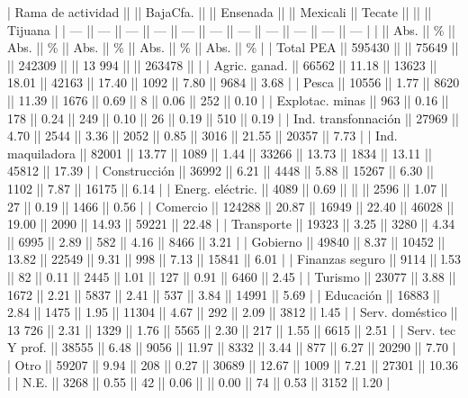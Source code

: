 \documentclass{article}
\begin{document}
| Rama de actividad   ||        || BajaCfa. ||       || Ensenada ||        || Mexicali || Tecate ||       ||        || Tijuana |
| ---                 || ---    || ---      || ---   || ---      || ---    || ---      || ---    || ---   || ---    || ---     |
|                     || Abs.   || \%        || Abs.  || \%        || Abs.   || \%        || Abs.   || \%     || Abs.   || \%       |
| Total PEA           || 595430 ||          || 75649 ||          || 242309 ||          || 13 994 ||       || 263478 ||         |
| Agric. ganad.       || 66562  || 11.18    || 13623 || 18.01    || 42163  || 17.40    || 1092   || 7.80  || 9684   || 3.68    |
| Pesca               || 10556  || 1.77     || 8620  || 11.39    || 1676   || 0.69     || 8      || 0.06  || 252    || 0.10    |
| Explotac. minas     || 963    || 0.16     || 178   || 0.24     || 249    || 0.10     || 26     || 0.19  || 510    || 0.19    |
| Ind. transfonnación || 27969  || 4.70     || 2544  || 3.36     || 2052   || 0.85     || 3016   || 21.55 || 20357  || 7.73    |
| Ind. maquiladora    || 82001  || 13.77    || 1089  || 1.44     || 33266  || 13.73    || 1834   || 13.11 || 45812  || 17.39   |
| Construcción        || 36992  || 6.21     || 4448  || 5.88     || 15267  || 6.30     || 1102   || 7.87  || 16175  || 6.14    |
| Energ. eléctric.    || 4089   || 0.69     ||       ||          || 2596   || 1.07     || 27     || 0.19  || 1466   || 0.56    |
| Comercio            || 124288 || 20.87    || 16949 || 22.40    || 46028  || 19.00    || 2090   || 14.93 || 59221  || 22.48   |
| Transporte          || 19323  || 3.25     || 3280  || 4.34     || 6995   || 2.89     || 582    || 4.16  || 8466   || 3.21    |
| Gobierno            || 49840  || 8.37     || 10452 || 13.82    || 22549  || 9.31     || 998    || 7.13  || 15841  || 6.01    |
| Finanzas seguro     || 9114   || l.53     || 82    || 0.11     || 2445   || l.01     || 127    || 0.91  || 6460   || 2.45    |
| Turismo             || 23077  || 3.88     || 1672  || 2.21     || 5837   || 2.41     || 537    || 3.84  || 14991  || 5.69    |
| Educación           || 16883  || 2.84     || 1475  || 1.95     || 11304  || 4.67     || 292    || 2.09  || 3812   || l.45    |
| Serv. doméstico     || 13 726 || 2.31     || 1329  || 1.76     || 5565   || 2.30     || 217    || 1.55  || 6615   || 2.51    |
| Serv. tec Y prof.   || 38555  || 6.48     || 9056  || 1l.97    || 8332   || 3.44     || 877    || 6.27  || 20290  || 7.70    |
| Otro                || 59207  || 9.94     || 208   || 0.27     || 30689  || 12.67    || 1009   || 7.21  || 27301  || 10.36   |
| N.E.                || 3268   || 0.55     || 42    || 0.06     ||        || 0.00     || 74     || 0.53  || 3152   || l.20    |
\end{document}
